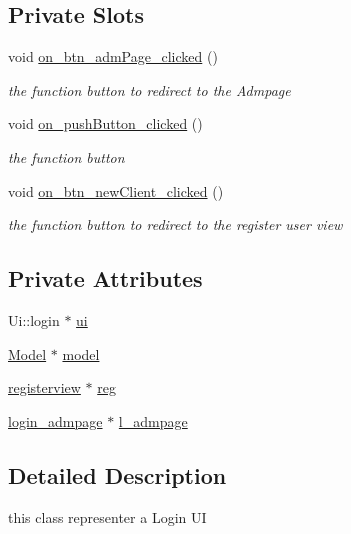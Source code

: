 \subsection*{Private Slots}
\begin{DoxyCompactItemize}
\item 
void \hyperlink{classlogin_afd45d9eb7e10b36d5b40f598de3fa2c8}{on\+\_\+btn\+\_\+adm\+Page\+\_\+clicked} ()
\begin{DoxyCompactList}\small\item\em the function button to redirect to the Admpage \end{DoxyCompactList}\item 
void \hyperlink{classlogin_a443d3a41176756820926a515cbd4cd1f}{on\+\_\+push\+Button\+\_\+clicked} ()
\begin{DoxyCompactList}\small\item\em the function button \end{DoxyCompactList}\item 
void \hyperlink{classlogin_aad5cd482a25f3c951bd5ecf1d12bb1a5}{on\+\_\+btn\+\_\+new\+Client\+\_\+clicked} ()
\begin{DoxyCompactList}\small\item\em the function button to redirect to the register user view \end{DoxyCompactList}\end{DoxyCompactItemize}
\subsection*{Private Attributes}
\begin{DoxyCompactItemize}
\item 
Ui\+::login $\ast$ \hyperlink{classlogin_ab08986017bf8d41e5cbab46dd0492d38}{ui}
\item 
\hyperlink{classModel}{Model} $\ast$ \hyperlink{classlogin_a2e047dc21e76732165598efabd633aa4}{model}
\item 
\hyperlink{classregisterview}{registerview} $\ast$ \hyperlink{classlogin_ae69e30e8855dbf4a08d3080edc6fcde4}{reg}
\item 
\hyperlink{classlogin__admpage}{login\+\_\+admpage} $\ast$ \hyperlink{classlogin_ac0ba28b943ddc71777895e7144ac26a6}{l\+\_\+admpage}
\end{DoxyCompactItemize}


\subsection{Detailed Description}
this class representer a Login UI 

